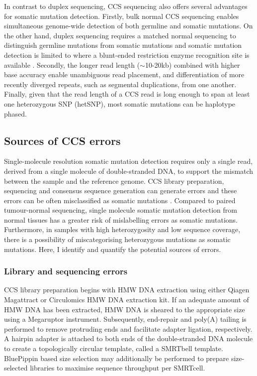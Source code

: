 In contrast to duplex sequencing, CCS sequencing also offers several advantages for somatic mutation detection. Firstly, bulk normal CCS sequencing enables simultaneous genome-wide detection of both germline and somatic mutations. On the other hand, duplex sequencing requires a matched normal sequencing to distinguish germline mutations from somatic mutations and somatic mutation detection is limited to where a blunt-ended restriction enzyme recognition site is available \cite{Abascal2021-pk}. Secondly, the longer read length ($\sim$10-20kb) combined with higher base accuracy enable unambiguous read placement, and differentiation of more recently diverged repeats, such as segmental duplications, from one another. Finally, given that the read length of a CCS read is long enough to span at least one heterozygous SNP (hetSNP), most somatic mutations can be haplotype phased. 

\subsection{Sources of CCS errors}

Single-molecule resolution somatic mutation detection requires only a single read, derived from a single molecule of double-stranded DNA, to support the mismatch between the sample and the reference genome. CCS library preparation, sequencing and consensus sequence generation can generate errors and these errors can be often misclassified as somatic mutations \cite{Cibulskis2013-gw}. Compared to paired tumour-normal sequencing, single molecule somatic mutation detection from normal tissues has a greater risk of mislabelling errors as somatic mutations. Furthermore, in samples with high heterozygosity and low sequence coverage, there is a possibility of miscategorising heterozygous mutations as somatic mutations. Here, I identify and quantify the potential sources of errors.

\subsubsection{Library and sequencing errors}

CCS library preparation begins with HMW DNA extraction using either Qiagen Magattract or Circulomics HMW DNA extraction kit. If an adequate amount of HMW DNA has been extracted, HMW DNA is sheared to the appropriate size using a Megaruptor instrument. Subsequently, end-repair and poly(A) tailing is performed to remove protruding ends and facilitate adapter ligation, respectively. A hairpin adapter is attached to both ends of the double-stranded DNA molecule to create a topologically circular template, called a SMRTbell template. BluePippin based size selection may additionally be performed to prepare size-selected libraries to maximise sequence throughput per SMRTcell. 


